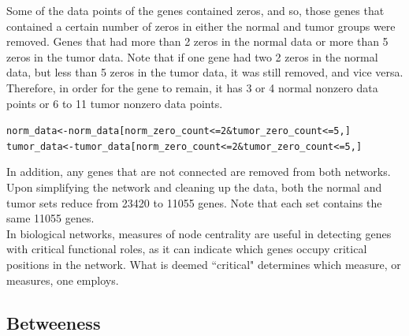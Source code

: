 \documentclass{article}\usepackage[]{graphicx}\usepackage[]{color}
\makeatletter
\newcommand{\hlnum}[1]{\textcolor[rgb]{0.686,0.059,0.569}{#1}}%
\newcommand{\hlopt}[1]{\textcolor[rgb]{0,0,0}{#1}}%
\newcommand{\hlstd}[1]{\textcolor[rgb]{0.345,0.345,0.345}{#1}}%
\newcommand{\hlkwb}[1]{\textcolor[rgb]{0.69,0.353,0.396}{#1}}%
\newenvironment{kframe}{%
 \def\at@end@of@kframe{}%
 \ifinner\ifhmode%
  \def\at@end@of@kframe{\end{minipage}}%
  \begin{minipage}{\columnwidth}%
 \fi\fi%
 \def\FrameCommand##1{\hskip\@totalleftmargin \hskip-\fboxsep
 \colorbox{shadecolor}{##1}\hskip-\fboxsep
     \hskip-\linewidth \hskip-\@totalleftmargin \hskip\columnwidth}%
 \MakeFramed {\advance\hsize-\width
   \@totalleftmargin\z@ \linewidth\hsize
   \@setminipage}}%
 {\par\unskip\endMakeFramed%
 \at@end@of@kframe}
\newenvironment{knitrout}{}{} %
\makeatother
\begin{document}
Some of the data points of the genes contained zeros, and so, those genes that contained a certain number of zeros in either the normal and tumor groups were removed. Genes that had more than 2 zeros in the normal data or more than 5 zeros in the tumor data. Note that if one gene had two 2 zeros in the normal data, but less than 5 zeros in the tumor data, it was still removed, and vice versa. Therefore, in order for the gene to remain, it has 3 or 4 normal nonzero data points or 6 to 11 tumor nonzero data points. 
\begin{knitrout}\small
{}\color{fgcolor}\begin{kframe}
\begin{alltt}
\hlstd{norm_data} \hlkwb{<-} \hlstd{norm_data[norm_zero_count} \hlopt{<=} \hlnum{2} \hlopt{&} \hlstd{tumor_zero_count} \hlopt{<=} \hlnum{5}\hlstd{,]}
\hlstd{tumor_data} \hlkwb{<-} \hlstd{tumor_data[norm_zero_count} \hlopt{<=} \hlnum{2} \hlopt{&} \hlstd{tumor_zero_count} \hlopt{<=} \hlnum{5}\hlstd{,]}
\end{alltt}
\end{kframe}
\end{knitrout}

In addition, any genes that are not connected are removed from both networks. Upon simplifying the network and cleaning up the data, both the normal and tumor sets reduce from 23420 to 11055 genes. Note that each set contains the same 11055 genes.\\
\newline
In biological networks, measures of node centrality are useful in detecting genes with critical functional roles, as it can indicate which genes occupy critical positions in the network. What is deemed ``critical" determines which measure, or measures, one employs. \\

\subsection{Betweeness}
\end{document}
